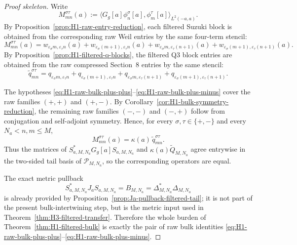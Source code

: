 \begin{proof}[Proof skeleton]
Write
\[
  M_{mn}^{\sigma\tau}(a)
  :=
  \bigl\langle G_g[a]\phi_n^\sigma[a],\phi_m^\tau[a]\bigr\rangle_{L^2(-a,a)}.
\]
By Proposition~\ref{prop:H1-raw-entry-reduction}, each filtered Suzuki block is
obtained from the corresponding raw Weil entries by the same four-term stencil:
\[
  M_{mn}^{\sigma\tau}(a)
  =
  w_{\varepsilon_\sigma m,\varepsilon_\tau n}(a)
  +w_{\varepsilon_\sigma(m+1),\varepsilon_\tau n}(a)
  +w_{\varepsilon_\sigma m,\varepsilon_\tau(n+1)}(a)
  +w_{\varepsilon_\sigma(m+1),\varepsilon_\tau(n+1)}(a).
\]
By Proposition~\ref{prop:H1-filtered-q-blocks}, the filtered Q3 block entries are
obtained from the raw compressed Section~8 entries by the same stencil:
\[
  \widetilde q_{mn}^{\sigma\tau}
  =
  q_{\varepsilon_\sigma m,\varepsilon_\tau n}
  +q_{\varepsilon_\sigma(m+1),\varepsilon_\tau n}
  +q_{\varepsilon_\sigma m,\varepsilon_\tau(n+1)}
  +q_{\varepsilon_\sigma(m+1),\varepsilon_\tau(n+1)}.
\]

The hypotheses \eqref{eq:H1-raw-bulk-plus-plus}--\eqref{eq:H1-raw-bulk-plus-minus}
cover the raw families $(+,+)$ and $(+,-)$. By
Corollary~\ref{cor:H1-bulk-symmetry-reduction}, the remaining raw families
$(-,-)$ and $(-,+)$ follow from conjugation and self-adjoint symmetry. Hence,
for every $\sigma,\tau\in\{+,-\}$ and every $N_a<n,m\le M$,
\[
  M_{mn}^{\sigma\tau}(a)=\kappa(a)\,\widetilde q_{mn}^{\sigma\tau}.
\]
Thus the matrices of $S_{a,M,N_a}^*G_g[a]S_{a,M,N_a}$ and
$\kappa(a)\widetilde Q_{M,N_a}$ agree entrywise in the two-sided tail basis
of $\mathcal P_{M,N_a}$, so the corresponding operators are equal.

The exact metric pullback
\[
  S_{a,M,N_a}^*J_aS_{a,M,N_a}=B_{M,N_a}=\Delta_{M,N_a}^*\Delta_{M,N_a}
\]
is already provided by Proposition~\ref{prop:Ja-pullback-filtered-tail}; it is
not part of the present bulk-intertwining step, but is the metric input used in
Theorem~\ref{thm:H3-filtered-transfer}. Therefore the whole burden of
Theorem~\ref{thm:H1-filtered-bulk} is exactly the pair of raw bulk identities
\eqref{eq:H1-raw-bulk-plus-plus}--\eqref{eq:H1-raw-bulk-plus-minus}.
\end{proof}
